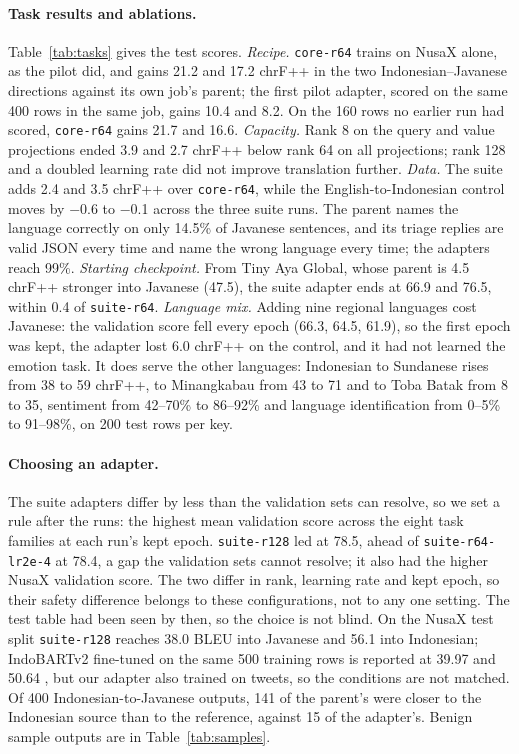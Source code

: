 \documentclass[11pt]{article}
\newcommand{\run}[1]{\texttt{#1}}
\begin{document}
\paragraph{Task results and ablations.} Table~\ref{tab:tasks} gives the test scores. \textit{Recipe.}
\run{core-r64} trains on NusaX alone, as the pilot did, and gains 21.2 and 17.2 chrF++ in the two
Indonesian--Javanese directions against its own job's parent; the first pilot adapter, scored on the same 400 rows
in the same job, gains 10.4 and 8.2. On the 160 rows no earlier run had scored, \run{core-r64} gains 21.7 and
16.6. \textit{Capacity.} Rank 8 on the query and value projections ended 3.9 and 2.7 chrF++ below rank 64 on all
projections; rank 128 and a doubled learning rate did not improve translation further. \textit{Data.} The suite
adds 2.4 and 3.5 chrF++ over \run{core-r64}, while the English-to-Indonesian control moves by $-$0.6 to $-$0.1
across the three suite runs. The parent names the language correctly on only 14.5\% of Javanese sentences, and
its triage replies are valid JSON every time and name the wrong language every time; the adapters reach 99\%.
\textit{Starting checkpoint.} From Tiny Aya Global, whose parent is 4.5 chrF++ stronger into Javanese (47.5), the
suite adapter ends at 66.9 and 76.5, within 0.4 of \run{suite-r64}. \textit{Language mix.} Adding nine regional
languages cost Javanese: the validation score fell every epoch (66.3, 64.5, 61.9), so the first epoch was kept,
the adapter lost 6.0 chrF++ on the control, and it had not learned the emotion task. It does serve the other
languages: Indonesian to Sundanese rises from 38 to 59 chrF++, to Minangkabau from 43 to 71 and to Toba Batak
from 8 to 35, sentiment from 42--70\% to 86--92\% and language identification from 0--5\% to 91--98\%, on 200
test rows per key.

\paragraph{Choosing an adapter.} The suite adapters differ by less than the validation sets can resolve, so we
set a rule after the runs: the highest mean validation score across the eight task families at each run's kept
epoch. \run{suite-r128} led at 78.5, ahead of \run{suite-r64-lr2e-4} at 78.4, a gap the validation sets cannot
resolve; it also had the higher NusaX validation score. The two differ in rank, learning rate and kept epoch, so their
safety difference belongs to these configurations, not to any one setting. The test table had been seen by then, so the choice is not blind.
On the NusaX test split \run{suite-r128} reaches 38.0 BLEU into Javanese and 56.1 into Indonesian; IndoBARTv2
fine-tuned on the same 500 training rows is reported at 39.97 and 50.64 \citep{winata2023nusax}, but our
adapter also trained on tweets, so the conditions are not matched. Of 400 Indonesian-to-Javanese outputs, 141
of the parent's were closer to the Indonesian source than to the reference, against 15 of the adapter's. Benign sample outputs are in Table~\ref{tab:samples}.
\end{document}
